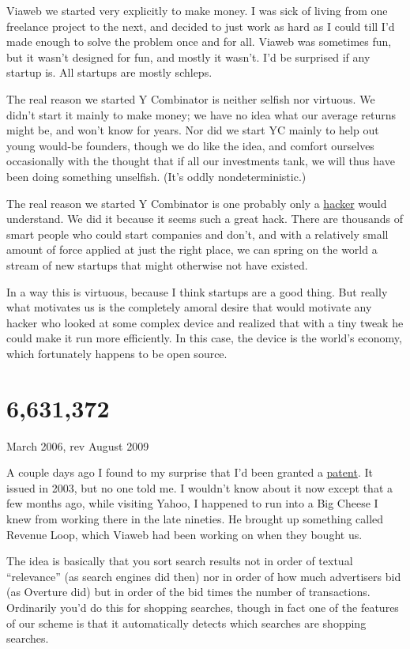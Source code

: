 \documentclass[12pt]{book}
\begin{document}
Viaweb we started very explicitly to make money. I was sick of living
from one freelance project to the next, and decided to just work as hard
as I could till I'd made enough to solve the problem once and for all.
Viaweb was sometimes fun, but it wasn't designed for fun, and mostly it
wasn't. I'd be surprised if any startup is. All startups are mostly
schleps.

The real reason we started Y Combinator is neither selfish nor virtuous.
We didn't start it mainly to make money; we have no idea what our
average returns might be, and won't know for years. Nor did we start YC
mainly to help out young would-be founders, though we do like the idea,
and comfort ourselves occasionally with the thought that if all our
investments tank, we will thus have been doing something unselfish.
(It's oddly nondeterministic.)

The real reason we started Y Combinator is one probably only a
\href{gba.html}{hacker} would understand. We did it because it seems
such a great hack. There are thousands of smart people who could start
companies and don't, and with a relatively small amount of force applied
at just the right place, we can spring on the world a stream of new
startups that might otherwise not have existed.

In a way this is virtuous, because I think startups are a good thing.
But really what motivates us is the completely amoral desire that would
motivate any hacker who looked at some complex device and realized that
with a tiny tweak he could make it run more efficiently. In this case,
the device is the world's economy, which fortunately happens to be open
source.
\chapter{6,631,372}

March 2006, rev August 2009

A couple days ago I found to my surprise that I'd been granted a
\href{http://patft.uspto.gov/netacgi/nph-Parser?Sect1=PTO1&Sect2=HITOFF&d=PALL&p=1&u=\%2Fnetahtml\%2FPTO\%2Fsrchnum.htm&r=1&f=G&l=50&s1=6,631,372.PN.&OS=PN/6,631,372&RS=PN/6,631,372}{patent}.
It issued in 2003, but no one told me. I wouldn't know about it now
except that a few months ago, while visiting Yahoo, I happened to run
into a Big Cheese I knew from working there in the late nineties. He
brought up something called Revenue Loop, which Viaweb had been working
on when they bought us.

The idea is basically that you sort search results not in order of
textual ``relevance'' (as search engines did then) nor in order of how
much advertisers bid (as Overture did) but in order of the bid times the
number of transactions. Ordinarily you'd do this for shopping searches,
though in fact one of the features of our scheme is that it
automatically detects which searches are shopping searches.
\end{document}
